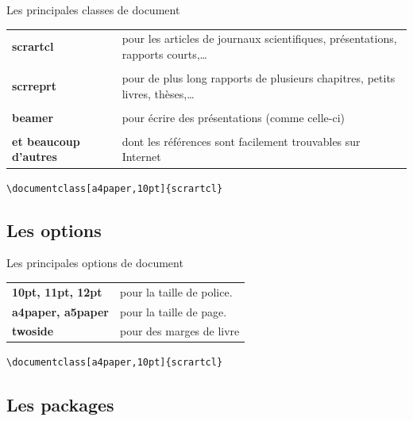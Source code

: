 \begin{frame}[fragile]{\Warning Les principales classes de document}
  \begin{tabular}{p{}p{}}
    \textbf{scrartcl} & pour les articles de journaux scientifiques, présentations, rapports courts,\dots \\ \\
    \textbf{scrreprt} & pour de plus long rapports de plusieurs chapitres, petits livres, thèses,\dots \\ \\
    \textbf{beamer} & pour écrire des présentations (comme celle-ci) \\ \\
    \textbf{et beaucoup d'autres} & dont les références sont facilement trouvables sur Internet
  \end{tabular}
  \begin{center}
  \verb|\documentclass[a4paper,10pt]{|\alert{\texttt{scrartcl}}\verb|}|\\
  \end{center}
\end{frame}

\subsection{Les options}

\begin{frame}[fragile]{Les principales options de document}
  \begin{tabular}{lp{8cm}}
    \textbf{10pt, 11pt, 12pt} & pour la taille de police.\\
    \textbf{a4paper, a5paper} & pour la taille de page.\\
    \textbf{twoside} & pour des marges de livre
  \end{tabular}
  \vspace{1cm}
  \begin{center}
  \verb|\documentclass[|\alert{\texttt{a4paper,10pt}}\verb|]{scrartcl}|\\
  \end{center}
\end{frame}

\subsection{Les packages}

